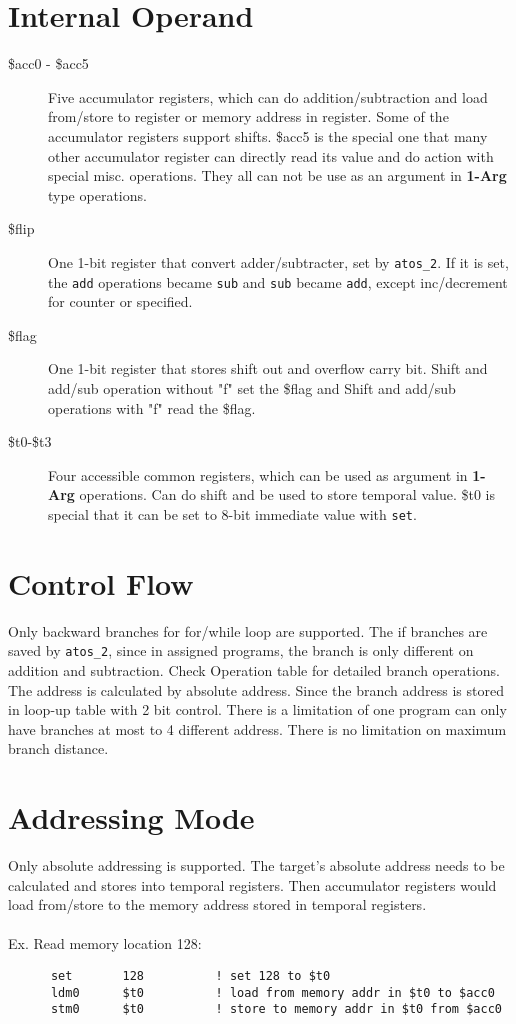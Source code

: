\documentclass{article}
\begin{document}
  \section{Internal Operand}
    \begin{adjustwidth}{0.8cm}{}
      \begin{description}
        \item[\$acc0 - \$acc5] Five accumulator registers, which can do addition/subtraction and load from/store to register or
          memory address in register. Some of the accumulator registers support shifts. \$acc5 is the special one that many other
          accumulator register can directly read its value and do action with special misc. operations. They all can not be use
          as an argument in \textbf{1-Arg} type operations.
        \item[\$flip] One 1-bit register that convert adder/subtracter, set by \texttt{atos\_2}. If it is set, the \texttt{add}
          operations became \texttt{sub} and \texttt{sub} became \texttt{add}, except inc/decrement for counter or specified.
        \item[\$flag] One 1-bit register that stores shift out and overflow carry bit. Shift and add/sub operation without "f" set
          the \$flag and Shift and add/sub operations with "f" read the \$flag.
        \item[\$t0-\$t3] Four accessible common registers, which can be used as argument in \textbf{1-Arg} operations. Can do
          shift and be used to store temporal value. \$t0 is special that it can be set to 8-bit immediate value with \texttt{set}.
      \end{description}
    \end{adjustwidth}
  \section{Control Flow}
    \qquad Only backward branches for for/while loop are supported. The if branches are saved by \texttt{atos\_2}, since in assigned
    programs, the branch is only different on addition and subtraction. Check Operation table for detailed branch operations.
    The address is calculated by absolute address. Since the branch address is stored in loop-up table with 2 bit control.
    There is a limitation of one program can only have branches at most to 4 different address. There is no limitation on
    maximum branch distance.
  \section{Addressing Mode}
    \qquad Only absolute addressing is supported. The target's absolute address needs to be calculated and stores into temporal registers.
    Then accumulator registers would load from/store to the memory address stored in temporal registers. \\ \\
    \text{\qquad}Ex. Read memory location 128:
    \begin{lstlisting}
      set       128          ! set 128 to $t0
      ldm0      $t0          ! load from memory addr in $t0 to $acc0
      stm0      $t0          ! store to memory addr in $t0 from $acc0
    \end{lstlisting}
\end{document}

